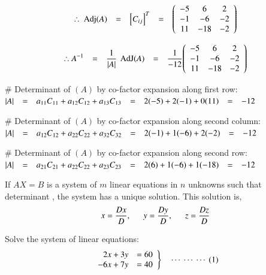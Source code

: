 \documentclass[12pt]{article}
\renewenvironment{pmatrix}
{\left(\begin{array}{ccc}}
{\end{array}\right)}
\begin{document}
\vspace{-0.5\baselineskip}
\begin{equation*}
   \therefore \operatorname{\ Adj }(A) \tab = \tab \left[C_{ij}\right]^T \tab = \tab \begin{pmatrix}
      -5 & 6 & 2 \\ -1 & -6 & -2 \\ 11 & -18 & -2
   \end{pmatrix}\\   
\end{equation*}

\begin{equation*}
\therefore A^{-1} \tab = \tab \frac{1}{|A|} \operatorname{\ AdJ }(A) \tab = \tab \frac{1}{-12}
\begin{pmatrix}
   -5 & 6 & 2 \\ -1 & -6 & -2 \\ 11 & -18 & -2
\end{pmatrix}
\end{equation*}

\# Determinant of $(A)$ by co-factor expansion along first
row:\\
$|A| \ \ \  = \ \ \  a_{11} C_{11}+a_{12} C_{12}+a_{13} C_{13} \ \ \  = \ \ \  2(-5)+2(-1)+0(11) \ \ \  = \ \ \  -12$

\# Determinant of $(A)$ by co-factor expansion along second
column:\\
$|A| \ \ \  = \ \ \  a_{12} C_{12}+a_{22} C_{22}+a_{32} C_{32} \ \ \  = \ \ \  2(-1)+1(-6)+2(-2) \ \ \  = \ \ \  -12$

\# Determinant of $(A)$ by co-factor expansion along second
row:\\
$|A| \ \ \  = \ \ \  a_{21} C_{21}+a_{22} C_{22}+a_{23} C_{23} \ \ \  = \ \ \  2(6)+1(-6)+1(-18) \ \ \  = \ \ \  -12$



If $AX=B$ is a system of $m$ linear equations in $n$ unknowns such that determinant , the system has a unique solution. This solution is,
$$x=\frac{Dx}{D}, \ \ \ \ \ \  y=\frac{Dy}{D}, \ \ \ \ \ \  z=\frac{Dz}{D}$$

\hrline

 Solve the system of linear equations:
\begin{equation*}
\left.\begin{array}{rl}
2x+3 y & =60 \\
-6x+7 y & =40
\end{array}\right\} \ \ \  \ \cdots \ \cdots \ \cdots \ (1)
\end{equation*}
\end{document}
